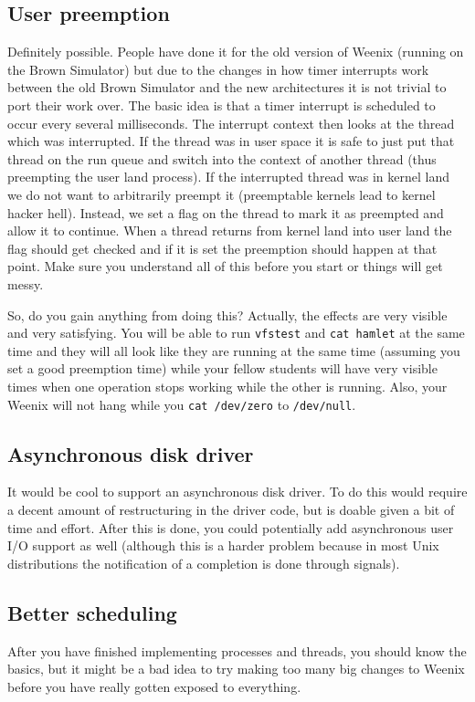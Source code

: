 \subsection{User preemption}
Definitely possible. People have done it for the old version of Weenix (running on the Brown Simulator) but due to the changes in how timer interrupts work between the old Brown Simulator and the new architectures it is not trivial to port their work over. The basic idea is that a timer interrupt is scheduled to occur every several milliseconds. The interrupt context then looks at the thread which was interrupted. If the thread was in user space it is safe to just put that thread on the run queue and switch into the context of another thread (thus preempting the user land process). If the interrupted thread was in kernel land we do not want to arbitrarily preempt it (preemptable kernels lead to kernel hacker hell). Instead, we set a flag on the thread to mark it as preempted and allow it to continue. When a thread returns from kernel land into user land the flag should get checked and if it is set the preemption should happen at that point. Make sure you understand all of this before you start or things will get messy.

So, do you gain anything from doing this? Actually, the effects are very visible and very satisfying. You will be able to run \texttt{vfstest} and \texttt{cat hamlet} at the same time and they will all look like they are running at the same time (assuming you set a good preemption time) while your fellow students will have very visible times when one operation stops working while the other is running. Also, your Weenix will not hang while you \texttt{cat /dev/zero} to \texttt{/dev/null}.

\subsection{Asynchronous disk driver}
It would be cool to support an asynchronous disk driver. To do this would require a decent amount of restructuring in the driver code, but is doable given a bit of time and effort. After this is done, you could potentially add asynchronous user I/O support as well (although this is a harder problem because in most Unix distributions the notification of a completion is done through signals).

\subsection{Better scheduling}
After you have finished implementing processes and threads, you should know the basics, but it might be a bad idea to try making too many big changes to Weenix before you have really gotten exposed to everything. %

